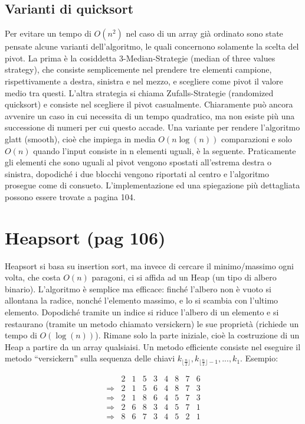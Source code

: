 \documentclass[a4paper]{book}
\begin{document}
\subsection*{Varianti di quicksort}
Per evitare un tempo di $O(n^2)$ nel caso di un array già ordinato sono state pensate alcune varianti dell'algoritmo, le quali concernono solamente la scelta del pivot. La prima è la cosiddetta 3-Median-Strategie (median of three values strategy), che consiste semplicemente nel prendere tre elementi campione, rispettivamente a destra, sinistra e nel mezzo, e scegliere come pivot il valore medio tra questi.
L'altra strategia si chiama Zufalls-Strategie (randomized quicksort) e consiste nel scegliere il pivot casualmente. Chiaramente può ancora avvenire un caso in cui necessita di un tempo quadratico, ma non esiste più una successione di numeri per cui questo accade. Una variante per rendere l'algoritmo glatt (smooth), cioè che impiega in media $O(n \log (n))$ comparazioni e  solo $O(n)$ quando l'input consiste in n elementi uguali, è la seguente. Praticamente gli elementi che sono uguali al pivot vengono spostati all'estrema destra o sinistra, dopodiché i due blocchi vengono riportati al centro e l'algoritmo prosegue come di consueto. L'implementazione ed una spiegazione più dettagliata possono essere trovate a pagina 104.

\section{Heapsort (pag 106)}
Heapsort si basa su insertion sort, ma invece di cercare il minimo/massimo ogni volta, che costa $O(n)$ paragoni, ci si affida ad un Heap (un tipo di albero binario). L'algoritmo è semplice ma efficace: finché l'albero non è vuoto si allontana la radice, nonché l'elemento massimo, e lo si scambia con l'ultimo elemento. Dopodiché tramite un indice si riduce l'albero di un elemento e si restaurano (tramite un metodo chiamato versickern) le sue proprietà (richiede un tempo di $O(\log (n))$). Rimane solo la parte iniziale, cioè la costruzione di un Heap a partire da un array qualsiaisi. Un metodo efficiente consiste nel eseguire il metodo ``versickern'' sulla sequenza delle chiavi $k_{\lfloor \frac{n}{2} \rfloor}, k_{\lfloor \frac{n}{2} \rfloor - 1}, ... , k_1$. Esempio:

\[\begin{array}{*{20}{c}}
{}&{2}&1&{5}&{3}&4&8&7&6\\
{\Rightarrow}&2&{1}&{5}&{6}&4&8&7&3\\
{\Rightarrow}&2&{1}&{8}&{6}&4&5&7&3\\
{\Rightarrow}&2&{6}&{8}&3&{4}&5&7&1\\
{\Rightarrow}&8&{6}&7&{3}&{4}&5&2&1\\
\end{array}\]
\end{document}
